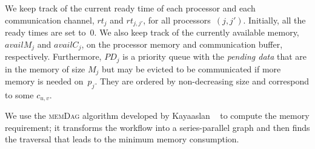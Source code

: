 \documentclass[conference]{IEEEtran}
\newcommand{\algo}[1]{\textsc{#1}}
\newcommand{\MM}{M}
\newcommand{\rt}{rt}
\newcommand{\PD}{PD}
\begin{document}
    We keep track of the current ready time of each processor and each communication
    channel, $\rt_j$ and $\rt_{j,j'}$, for all processors~$(j,j')$.
    Initially, all the ready times are set to~$0$.
    We also keep track of the currently available memory, $availM_j$ and $availC_j$,
    on the processor memory and communication buffer, respectively.
    Furthermore, $\PD_j$ is a priority queue with the {\em pending data}
    that are in the memory of size $\MM_j$ but may be evicted to be communicated if
    more memory is needed on~$p_j$. They are ordered by non-decreasing size and
    correspond to some $c_{u,v}$.

    We use the \algo{memDag} algorithm developed by Kayaaslan \etal~\cite{KAYAASLAN20181} to compute
    the memory requirement; it transforms the workflow into a series-parallel graph
    and then finds the traversal that leads to the minimum memory consumption.
\end{document}
